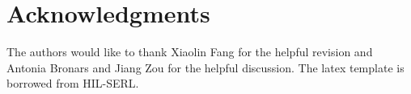 \section*{Acknowledgments}
The authors would like to thank Xiaolin Fang for the helpful revision and Antonia Bronars and Jiang Zou for the helpful discussion. The latex template is borrowed from HIL-SERL.

